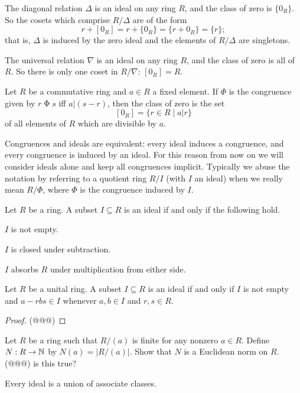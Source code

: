 \begin{examples}
\item The diagonal relation \(\Delta\) is an ideal on any ring \(R\), and the class of zero is \(\{0_R\}\). So the cosets which comprise \(R/\Delta\) are of the form \[ r+[0_R] = r+\{0_R\} = \{ r+0_R \} = \{r\}; \] that is, \(\Delta\) is induced by the zero ideal and the elements of \(R/\Delta\) are singletons.
\item The universal relation \(\nabla\) is an ideal on any ring \(R\), and the class of zero is all of \(R\). So there is only one coset in \(R/\nabla\): \([0_R] = R\).
\item Let \(R\) be a commutative ring and \(a \in R\) a fixed element. If \(\Phi\) is the congruence given by \(r \mathrel{\Phi} s\) iff \(a|(s-r)\), then the class of zero is the set \[ [0_R] = \{ r \in R \mid a|r \} \] of all elements of \(R\) which are divisible by \(a\).
\end{examples}

Congruences and ideals are equivalent: every ideal induces a congruence, and every congruence is induced by an ideal. For this reason from now on we will consider ideals alone and keep all congruences implicit. Typically we abuse the notation by referring to a quotient ring \(R/I\) (with \(I\) an ideal) when we really mean \(R/\Phi\), where \(\Phi\) is the congruence induced by \(I\).

\begin{prop}
Let \(R\) be a ring. A subset \(I \subseteq R\) is an ideal if and only if the following hold.
\begin{proplist}
\item \(I\) is not empty.
\item \(I\) is closed under subtraction.
\item \(I\) absorbs \(R\) under multiplication from either side.
\end{proplist}
\end{prop}

\begin{prop}
Let \(R\) be a unital ring. A subset \(I \subseteq R\) is an ideal if and only if \(I\) is not empty and \(a - rbs \in I\) whenever \(a,b \in I\) and \(r,s \in R\).
\end{prop}

\begin{proof}
(@@@)
\end{proof}

\Exercises%

\begin{exercise}
Let \(R\) be a ring such that \(R/(a)\) is finite for any nonzero \(a \in R\). Define \(N : R \rightarrow \mathbb{N}\) by \(N(a) = |R/(a)|\). Show that \(N\) is a Euclidean norm on \(R\). (@@@) is this true?
\end{exercise}

\begin{exercise}
Every ideal is a union of associate classes.
\end{exercise}
